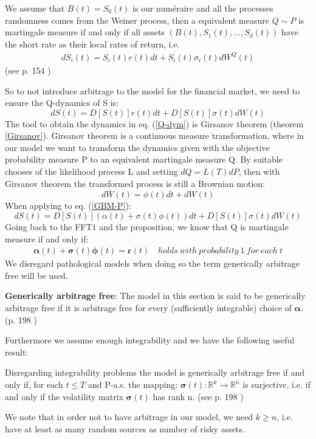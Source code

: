 \theoremstyle{proposition}
\begin{proposition}{}
We assume that $B(t)=S_0(t)$ is our numéraire and all the processes randomness comes from the Weiner process, then a equivalent measure $Q \sim P$ is martingale measure if and only if all assets $(B(t), S_1(t), \ldots, S_d(t))$ have the short rate as their local rates of return, i.e.
\begin{align}
dS_i(t)=S_i(t)r(t)dt+S_i(t)\sigma_i(t)dW^Q(t)
\end{align}
(see p. 154 \parencite{finKont})
\end{proposition}
So to not introduce arbitrage to the model for the financial market, we need to ensure the Q-dynamics of S is:
\begin{equation}\label{Q-dym}
dS(t)=D[S(t)]r(t)dt+D[S(t)]\sigma(t)d{W}(t)
\end{equation}
The tool to obtain the dynamics in eq. (\ref{Q-dym}) is Girsanov theorem (theorem \ref{Girsanov}). Girsanov theorem is a continuous measure transformation, where in our model we want to transform the dynamics given with the objective probability measure P to an equivalent martingale measure Q. By suitable chooses of the likelihood process L and setting $dQ=L(T)dP$, then with Girsanov theorem the transformed process is still a Brownian motion:
$$d\bar{W}(t)=\phi(t)dt + dW(t)$$
When applying to eq. (\ref{GBM-P}):
$$dS(t)=D[S(t)](\alpha(t)+\sigma(t)\phi(t))dt+D[S(t)]\sigma(t)d{W}(t)$$
Going back to the FFT1 and the proposition, we know that Q is martingale measure if and only if:
\begin{align}\label{marketPriceOfRisk}
\bm{\alpha}(t)+\bm{\sigma}(t)\bm{\phi}(t)=\textbf{r}(t) \quad holds \ with \ probability \ 1 \ for \ each \ t
\end{align}
We disregard pathological models when doing so the term generically arbitrage free will be used. 

\theoremstyle{definition}
\begin{definition}{\textbf{Generically arbitrage free}:}
The model in this section is said to be generically arbitrage free if it is arbitrage free for every (sufficiently integrable) choice of $\bm{\alpha}$.
(p. 198 \parencite{finKont})
\end{definition}

Furthermore we assume enough integrability and we have the following useful result:
\theoremstyle{proposition}
\begin{proposition}{}\label{arbitrageFreeProp}
Disregarding integrability problems the model is generically arbitrage free if and only if, for each $t\leq T$ and P-a.s. the mapping:
$\bm{\sigma}(t):\mathbb{R}^k \to \mathbb{R}^n$ is surjective, i.e. if and only if the volatility matrix $\bm{\sigma}(t)$ has rank n.
(see p. 198 \parencite{finKont})
\end{proposition}
We note that in order not to have arbitrage in our model, we need $k\geq n$, i.e. have at least as many random sources as number of risky assets.

